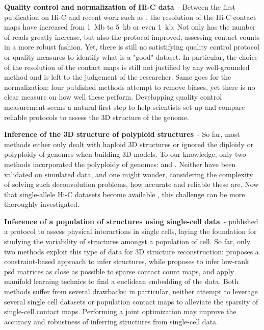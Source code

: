 \textbf{Quality control and normalization of Hi-C data}\ -
Between the first publication on Hi-C \citep{lieberman-aiden:comprehensive}
and recent work such as \citet{rao:3d, jin:high-resolution}, the resolution of
the Hi-C contact maps have increased from 1~Mb to 5~kb or even 1~kb. Not only
has the number of reads greatly increase, but also the protocol improved,
assessing contact counts in a more robust fashion. Yet, there is still no
satistifying quality control protocol or quality measures to identify what is
a "good" dataset. In particular, the choice of the resolution of the contact
maps is still not justified by any well-grounded method and is left to the
judgement of the researcher. Same goes for the normalization: four published
methods attempt to remove biases, yet there is no clear measure on how well
these perform. Developping quality control measurement seems a natural first
step to help scientists set up and compare reliable protocols to assess the 3D
structure of the genome.

\textbf{Inference of the 3D structure of polyploid structures}\ - So far, most
methods either only dealt with haploid 3D structures or ignored the diploidy
or polyploidy of genomes when building 3D models. To our knowledge, only two
methods incorporated the polyploidy of genomes: \citet{kalhor:genome} and
\citet{ay:identifying}. Neither have been validated on simulated data, and
one might wonder, considering the complexity of solving such deconvolution
problems, how accurate and reliable these are. Now that single-allele Hi-C
datasets become available \citep{deng:bipartite}, this challenge can be more
thoroughly investigated.

\textbf{Inference of a population of structures using single-cell data}\ -
\citet{nagano:single-cell} published a protocol to assess physical
interactions in single cells, laying the foundation for studying the variability
of structures amongst a population of cell. So far, only two methods exploit
this type of data for 3D structure reconstruction: \citet{nagano:single-cell}
proposes a constraint-based approach to infer structures, while
\citet{paulsen:manifold} proposes to infer low-rank psd matrices as close as
possible to sparse contact count maps, and apply manifold learning technics to
find a euclidean embedding of the data. Both methods suffer from several
drawbacks: in particular, neither attempt to leverage several single cell
datasets or population contact maps to alleviate the sparsity of single-cell
contact maps. Performing a joint optimization may improve the accuracy and
robustness of inferring structures from single-cell data.

